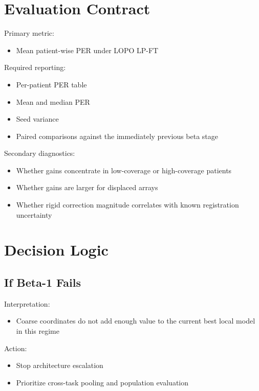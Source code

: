 \documentclass[
]{article}
\providecommand{\tightlist}{%
  \setlength{\itemsep}{0pt}\setlength{\parskip}{0pt}}
\begin{document}
\section{Evaluation Contract}\label{evaluation-contract}

Primary metric:

\begin{itemize}
\tightlist
\item
  Mean patient-wise PER under LOPO LP-FT
\end{itemize}

Required reporting:

\begin{itemize}
\tightlist
\item
  Per-patient PER table
\item
  Mean and median PER
\item
  Seed variance
\item
  Paired comparisons against the immediately previous beta stage
\end{itemize}

Secondary diagnostics:

\begin{itemize}
\tightlist
\item
  Whether gains concentrate in low-coverage or high-coverage patients
\item
  Whether gains are larger for displaced arrays
\item
  Whether rigid correction magnitude correlates with known registration
  uncertainty
\end{itemize}

\section{Decision Logic}\label{decision-logic}

\subsection{If Beta-1 Fails}\label{if-beta-1-fails}

Interpretation:

\begin{itemize}
\tightlist
\item
  Coarse coordinates do not add enough value to the current best local
  model in this regime
\end{itemize}

Action:

\begin{itemize}
\tightlist
\item
  Stop architecture escalation
\item
  Prioritize cross-task pooling and population evaluation
\end{itemize}
\end{document}
